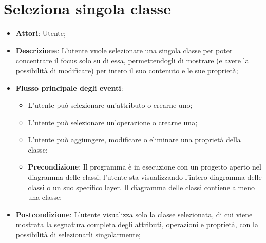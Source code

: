 \documentclass[../AnalisiDeiRequisiti.tex]{subfiles}
\begin{document}
	\section{Seleziona singola classe}
	\begin{itemize}
		\item \textbf{Attori}: Utente;
		\item \textbf{Descrizione}: L'utente vuole selezionare una singola classe per poter concentrare il focus solo su di essa, permettendogli di mostrare (e avere la possibilità di modificare) per intero il suo contenuto e le sue proprietà;
		\item \textbf{Flusso principale degli eventi}: 
		\begin{itemize}
		\item L'utente può selezionare un'attributo o crearne uno;
		\item L'utente può selezionare un'operazione o crearne una;
		\item L'utente può aggiungere, modificare o eliminare una proprietà della classe;
		\item \textbf{Precondizione}: Il programma è in esecuzione con un progetto aperto nel diagramma delle classi; l'utente sta visualizzando l'intero diagramma delle classi o un suo specifico layer. Il diagramma delle classi contiene almeno una classe;
		\end{itemize}
		\item \textbf{Postcondizione}: L'utente visualizza solo la classe selezionata, di cui viene mostrata la segnatura completa degli attributi, operazioni e proprietà, con la possibilità di selezionarli singolarmente;
	\end{itemize}	
	
\end{document}
